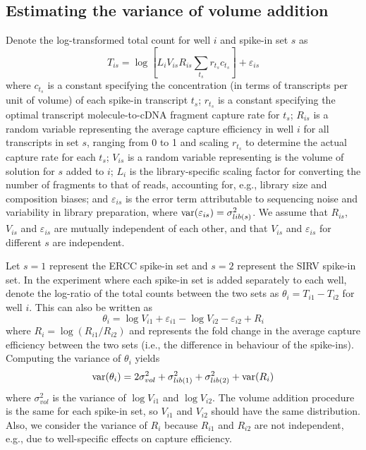 \documentclass{article}
\begin{document}
\subsection{Estimating the variance of volume addition}
Denote the log-transformed total count for well $i$ and spike-in set $s$ as
\[
T_{is} = \log \left[ L_i V_{is} R_{is} \sum_{t_s} r_{t_s} c_{t_s} \right] + \varepsilon_{is}
\]
where $c_{t_s}$ is a constant specifying the concentration (in terms of transcripts per unit of volume) of each spike-in transcript $t_s$;
$r_{t_s}$ is a constant specifying the optimal transcript molecule-to-cDNA fragment capture rate for $t_s$;
$R_{is}$ is a random variable representing the average capture efficiency in well $i$ for all transcripts in set $s$, ranging from 0 to 1 and scaling $r_{t_s}$ to determine the actual capture rate for each $t_s$;
$V_{is}$ is a random variable representing is the volume of solution for $s$ added to $i$;
$L_i$ is the library-specific scaling factor for converting the number of fragments to that of reads, accounting for, e.g., library size and composition biases;
and $\varepsilon_{is}$ is the error term attributable to sequencing noise and variability in library preparation, where $\mbox{var}(\varepsilon_{is})= \sigma^2_{lib(s)}$.
We assume that $R_{is}$, $V_{is}$ and $\varepsilon_{is}$ are mutually independent of each other, and that $V_{is}$ and $\varepsilon_{is}$ for different $s$ are independent.

Let $s=1$ represent the ERCC spike-in set and $s=2$ represent the SIRV spike-in set.
In the experiment where each spike-in set is added separately to each well, denote the log-ratio of the total counts between the two sets as $\theta_i = T_{i1} - T_{i2}$ for well $i$.
This can also be written as
\[
\theta_i = \log V_{i1} + \varepsilon_{i1} - \log V_{i2} - \varepsilon_{i2} + R_i
\]
where $R_i = \log(R_{i1}/R_{i2})$ and represents the fold change in the average capture efficiency between the two sets (i.e., the difference in behaviour of the spike-ins).
Computing the variance of $\theta_i$ yields
\[
\mbox{var}(\theta_i) = 2 \sigma^2_{vol} + \sigma^2_{lib(1)} + \sigma^2_{lib(2)} + \mbox{var}(R_i)
\]
where $\sigma^2_{vol}$ is the variance of $\log V_{i1}$ and $\log V_{i2}$.
The volume addition procedure is the same for each spike-in set, so $V_{i1}$ and $V_{i2}$ should have the same distribution.
Also, we consider the variance of $R_i$ because $R_{i1}$ and $R_{i2}$ are not independent, e.g., due to well-specific effects on capture efficiency.
\end{document}
